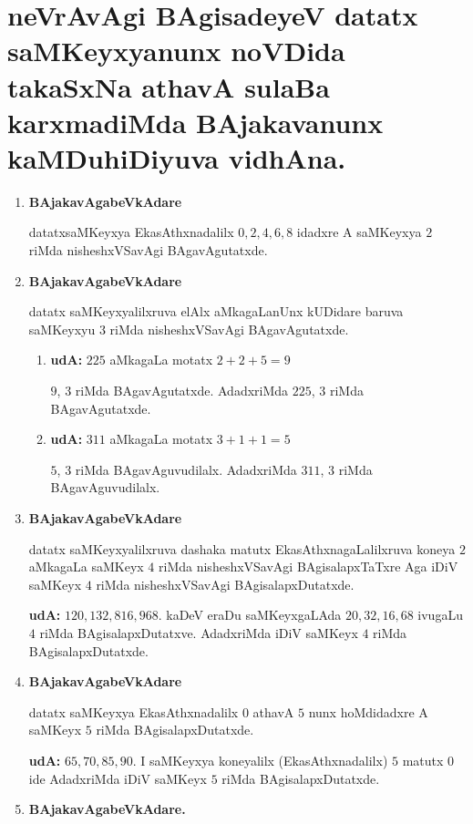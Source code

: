 \chapter{neVrAvAgi BAgisadeyeV datatx saMKeyxyanunx noVDida takaSxNa athavA sulaBa karxmadiMda BAjakavanunx kaMDuhiDiyuva vidhAna.}

\begin{enumerate}[{\rm 1)}]
\item {} \textbf{BAjakavAgabeVkAdare}

datatxsaMKeyxya EkasAthxnadalilx $0,2,4,6,8$ idadxre A saMKeyxya $2$ riMda \-nisheshxVSavAgi BAgavAgutatxde.

\item {} \textbf{BAjakavAgabeVkAdare}

datatx saMKeyxyalilxruva elAlx aMkagaLanUnx kUDidare baruva saMKeyxyu $3$ riMda nisheshxVSavAgi BAgavAgutatxde.
\begin{enumerate}[{\rm 1)}]
\item \textbf{udA:} \quad $225$ aMkagaLa motatx $2+2+5 =9$

$9$, $3$ riMda BAgavAgutatxde. AdadxriMda $225$, $3$ riMda BAgavAgutatxde.

\item \textbf{udA:} \quad $311$ aMkagaLa motatx $3+1+1 =5$

 $5$, $3$ riMda BAgavAguvudilalx. AdadxriMda $311$, $3$ riMda BAgavAguvudilalx.
\end{enumerate}

\vfill\eject
\item {} \textbf{BAjakavAgabeVkAdare}

datatx saMKeyxyalilxruva dashaka matutx EkasAthxnagaLalilxruva koneya $2$ aMkagaLa saMKeyx $4$ riMda nisheshxVSavAgi BAgisalapxTaTxre Aga iDiV saMKeyx $4$ riMda nisheshxVSavAgi BAgi\-salapxDutatxde.

\textbf{udA:} $120,132,816,968$. kaDeV eraDu saMKeyxgaLAda $20,32,16,68$ ivugaLu $4$ riMda BAgisalapxDutatxve. AdadxriMda iDiV saMKeyx $4$ riMda BAgi\-salapxDutatxde.

\item  {} \textbf{BAjakavAgabeVkAdare}

datatx saMKeyxya EkasAthxnadalilx $0$ athavA $5$ nunx hoMdidadxre A saMKeyx $5$ riMda BAgi\-salapxDutatxde.

\textbf{udA:} $65,70,85,90.$  I saMKeyxya koneyalilx (EkasAthxnadalilx) $5$ matutx $0$ ide AdadxriMda iDiV saMKeyx $5$ riMda BAgisalapxDutatxde.
\item {} \textbf{BAjakavAgabeVkAdare.}


\end{enumerate}
